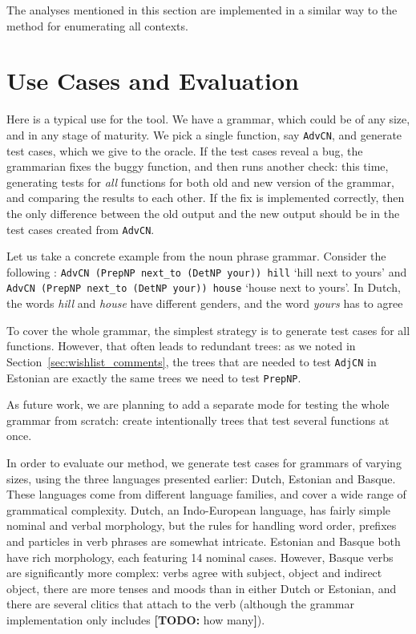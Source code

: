 \documentclass[11pt]{article}
\def\t#1{\texttt{#1}}
\newcommand{\todo}[1]{{\color{cyan}\textbf{[TODO: }#1\textbf{]}}}
\begin{document}
The analyses mentioned in this section are implemented in a similar way to the method for enumerating all contexts.

\section{Use Cases and Evaluation}

Here is a typical use for the tool. We have a grammar, which could be
of any size, and in any stage of maturity. We pick a single function,
say \t{AdvCN}, and generate test cases, which we give to the oracle. If
the test cases reveal a bug, the grammarian fixes the buggy function,
and then runs another check: this time, generating tests for
\emph{all} functions for both old and new version of the grammar, and
comparing the results to each other. If the fix is implemented
correctly, then the only difference between the old output and the new
output should be in the test cases created from \t{AdvCN}.

Let us take a concrete example from the noun phrase grammar. Consider
the following :
\t{AdvCN (PrepNP next\_to (DetNP your)) hill} `hill next to yours' and
\t{AdvCN (PrepNP next\_to (DetNP your)) house} `house next to
yours'. In Dutch, the words \emph{hill} and \emph{house} have
different genders, and the word \emph{yours} has to agree



To cover the whole grammar, the simplest strategy is to generate test
cases for all functions. However, that often leads to redundant trees:
as we noted in Section~\ref{sec:wishlist_comments}, the trees that
are needed to test \t{AdjCN} in Estonian are exactly the same
trees we need to test \t{PrepNP}. 


As future work, we are planning to add a separate mode for testing the
whole grammar from scratch: create intentionally trees that test
several functions at once.

In order to evaluate our method, we generate test cases for grammars
of varying sizes, using the three languages presented earlier: Dutch,
Estonian and Basque. These languages come from different language
families, and cover a wide range of grammatical complexity. Dutch, an
Indo-European language, has fairly simple nominal and verbal
morphology, but the rules for handling word order, prefixes and
particles in verb phrases are somewhat intricate. Estonian and Basque
both have rich morphology, each featuring 14 nominal cases. However, Basque
verbs are significantly more complex: verbs agree with subject, object
and indirect object, there are more tenses and moods than in either
Dutch or Estonian, and there are several clitics that attach to the
verb (although the grammar implementation only includes \todo{how
  many}). 
\end{document}
